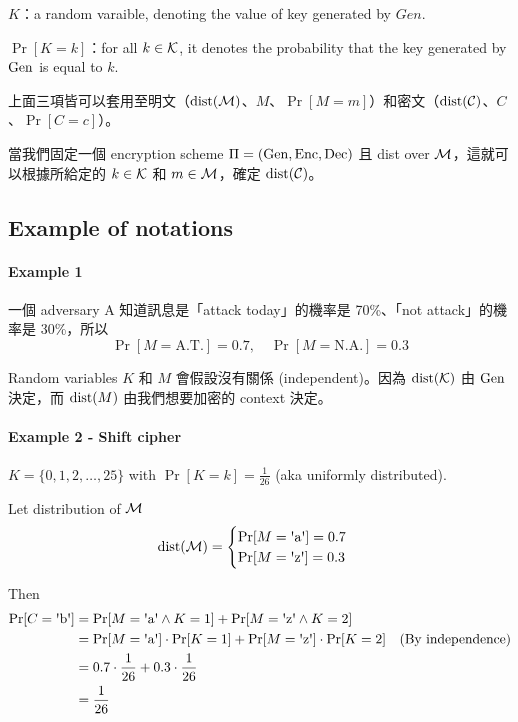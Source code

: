 \(K\)：a random varaible, denoting the value of key generated by \(Gen\).

\(\Pr[K = k]\)：for all \(k \in \operatorname{\mathcal{K}}\), it denotes the probability that the key generated by \(\operatorname{Gen}\) is equal to \(k\).

上面三項皆可以套用至明文（\(\operatorname{dist}(\operatorname{\mathcal{M}})\)、\(M\)、\(\Pr[M = m]\)）和密文（\(\operatorname{dist}(\operatorname{\mathcal{C}})\)、\(C\)、\(\Pr[C = c]\)）。

當我們固定一個 encryption scheme \(\Pi = (\operatorname{Gen}, \operatorname{Enc}, \operatorname{Dec})\) 且 dist over \(\operatorname{\mathcal{M}}\)，這就可以根據所給定的 \(k \in \operatorname{\mathcal{K}}\) 和 \(m \in \operatorname{\mathcal{M}}\)，確定 \(\operatorname{dist}(\operatorname{\mathcal{C}})\)。


\subsection{Example of notations}


\paragraph{Example 1}

一個 adversary A 知道訊息是「attack today」的機率是 70\%、「not attack」的機率是 30\%，所以
\[\Pr[M=\mathrm{A.T.}] = 0.7, \quad \Pr[M=\mathrm{N.A.}] = 0.3\]

Random variables \(K\) 和 \(M\) 會假設沒有關係 (independent)。因為 \(\operatorname{dist}(\operatorname{\mathcal{K}})\) 由 \(\operatorname{Gen}\) 決定，而 \(\operatorname{dist}(M)\) 由我們想要加密的 context 決定。


\paragraph{Example 2 - Shift cipher}

\(K = \{0, 1, 2, \ldots, 25\}\) with \(\Pr[K = k] = \displaystyle{\frac{1}{26}}\) (aka uniformly distributed).

Let distribution of \(\operatorname{\mathcal{M}}\)
\begin{equation*}
	\dist(\M) =
		\begin{cases}
			\Pr[M = \letter{a}] = 0.7 \\
			\Pr[M = \letter{z}] = 0.3
		\end{cases}
\end{equation*}

Then
\begin{align*}
	\Pr[C = \letter{b}] &= 
			\Pr[M = \letter{a} \wedge K = 1] +
			\Pr[M = \letter{z} \wedge K = 2] \\
		&= \Pr[M = \letter{a}] \cdot \Pr[K = 1] + 
			\Pr[M = \letter{z}] \cdot \Pr[K = 2]
			\quad \text{(By independence)} \\
		&= 0.7 \cdot \frac{1}{26} + 0.3 \cdot \frac{1}{26} \\
		&= \frac{1}{26}
\end{align*}

